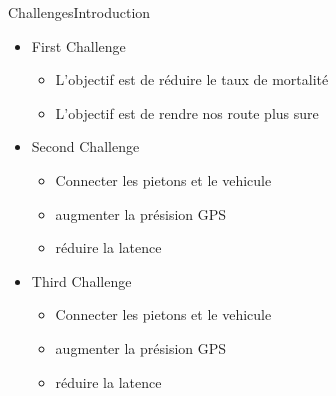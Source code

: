 \begin{frame}[bg]{Challenges}{Introduction}
	\begin{itemize}
		\item First Challenge
		\begin{itemize}
			\item L'objectif est de réduire le taux de mortalité
			\item L'objectif est de rendre nos route plus sure
		\end{itemize}
		
		\item Second Challenge
		\begin{itemize}
			\item Connecter les pietons et le vehicule
			\item augmenter la présision GPS
			\item réduire la latence
		\end{itemize}
		
		\item Third Challenge
		\begin{itemize}
			\item Connecter les pietons et le vehicule
			\item augmenter la présision GPS
			\item réduire la latence
		\end{itemize}
	\end{itemize}
























\end{frame}

